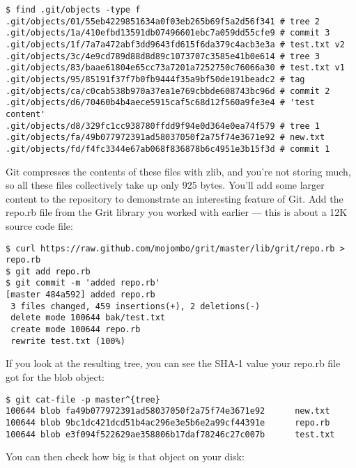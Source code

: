 \documentclass[a4paper]{book}
\begin{document}
\begin{shaded}\begin{verbatim}
$ find .git/objects -type f
.git/objects/01/55eb4229851634a0f03eb265b69f5a2d56f341 # tree 2
.git/objects/1a/410efbd13591db07496601ebc7a059dd55cfe9 # commit 3
.git/objects/1f/7a7a472abf3dd9643fd615f6da379c4acb3e3a # test.txt v2
.git/objects/3c/4e9cd789d88d8d89c1073707c3585e41b0e614 # tree 3
.git/objects/83/baae61804e65cc73a7201a7252750c76066a30 # test.txt v1
.git/objects/95/85191f37f7b0fb9444f35a9bf50de191beadc2 # tag
.git/objects/ca/c0cab538b970a37ea1e769cbbde608743bc96d # commit 2
.git/objects/d6/70460b4b4aece5915caf5c68d12f560a9fe3e4 # 'test content'
.git/objects/d8/329fc1cc938780ffdd9f94e0d364e0ea74f579 # tree 1
.git/objects/fa/49b077972391ad58037050f2a75f74e3671e92 # new.txt
.git/objects/fd/f4fc3344e67ab068f836878b6c4951e3b15f3d # commit 1
\end{verbatim}\end{shaded}

Git compresses the contents of these files with zlib, and you're not storing much, so all these files collectively take up only 925 bytes. You'll add some larger content to the repository to demonstrate an interesting feature of Git. Add the repo.rb file from the Grit library you worked with earlier --- this is about a 12K source code file:

\begin{shaded}\begin{verbatim}
$ curl https://raw.github.com/mojombo/grit/master/lib/grit/repo.rb > repo.rb
$ git add repo.rb
$ git commit -m 'added repo.rb'
[master 484a592] added repo.rb
 3 files changed, 459 insertions(+), 2 deletions(-)
 delete mode 100644 bak/test.txt
 create mode 100644 repo.rb
 rewrite test.txt (100%)
\end{verbatim}\end{shaded}

If you look at the resulting tree, you can see the SHA-1 value your repo.rb file got for the blob object:

\begin{shaded}\begin{verbatim}
$ git cat-file -p master^{tree}
100644 blob fa49b077972391ad58037050f2a75f74e3671e92      new.txt
100644 blob 9bc1dc421dcd51b4ac296e3e5b6e2a99cf44391e      repo.rb
100644 blob e3f094f522629ae358806b17daf78246c27c007b      test.txt
\end{verbatim}\end{shaded}

You can then check how big is that object on your disk:
\end{document}
